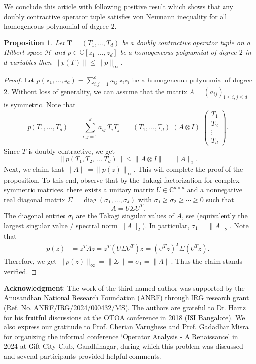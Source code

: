 \documentclass[12pt,reqno] {amsart}
\newtheorem{proposition}{Proposition}
\theoremstyle{remark}
\theoremstyle{definition}
\begin{document}
We conclude this article with following positive result which shows that  any doubly contractive operator tuple satisfies von Neumann inequality for all homogeneous polynomial of degree $2.$
\begin{proposition}\label{von Neumann's inequality for doubly contractive operators}
 Let \( \boldsymbol T = (T_1, \ldots, T_d) \) be a doubly contractive operator tuple on a Hilbert space $\mathcal{H}$ and $p\in \mathbb{C}[z_1,\ldots ,z_d]$  be a homogeneous polynomial of degree $2$ in $d$-variables then $\|p(T)\|\leq \|p\|_{\infty}$. 
 \end{proposition} 
 \begin{proof}
 Let $p(z_1,\ldots, z_d)=\sum_{i,j=1}^d a_{ij}\,z_i z_j$ be a homogeneous polynomial of degree $2.$ Without loss of generality, we can assume that the matrix $A=(a_{ij})_{1\le i,j\le d}$ is  symmetric. 
Note that
\[
p(T_1,\ldots,T_d)
 \;=\; \sum_{i,j=1}^d a_{ij}\,T_i T_j
 \;=\; (T_1,\ldots, T_d)\;
     (A \otimes I)\;
     \begin{pmatrix}
       T_1 \\[4pt] T_2 \\[4pt] \vdots \\[4pt] T_d
     \end{pmatrix}.
\]
Since $T$ is doubly contractive,  we get
$$\|p(T_1,T_2,\ldots,T_d)\| \leq \|A\otimes I\| = \|A\|_2.$$ 
Next, we claim that $\|A\|=\|p(z)\|_{\infty}$. This will complete the proof of the proposition. To this end, observe that 
by the Takagi factorization for complex symmetric matrices, there exists a unitary matrix \(U\in\mathbb{C}^{d\times d}\) and a nonnegative real diagonal matrix \(\Sigma=\operatorname{diag}(\sigma_1,\dots,\sigma_d)\) with \(\sigma_1\ge\sigma_2\ge\cdots\ge0\) such that
\[
A = U\Sigma U^T.
\]
The diagonal entries \(\sigma_i\) are the Takagi singular values of \(A\), see \cite{T.K} (equivalently the largest singular value / spectral norm \(\|A\|_2\)). In particular, \(\sigma_1=\|A\|_2\).
Note that 
\begin{align*}
p(z) &= z^T A z = z^T(U\Sigma U^T)z = (U^T z)^T \Sigma (U^T z).
\end{align*}
Therefore, we get $\|p(z)\|_{\infty}=\|\Sigma\|=\sigma_1=\|A\|.$ Thus the claim stands verified. 
  \end{proof}

\noindent\textbf{Acknowledgment:} The work of the third named author was supported by the Anusandhan National Research Foundation (ANRF) through IRG research grant (Ref. No. ANRF/IRG/2024/000432/MS). The authors are grateful to Dr. Hartz for his fruitful discussions at the OTOA conference in 2018 (ISI Bangalore). 
We also express our gratitude to Prof. Cherian Varughese and Prof. Gadadhar Misra for organizing the informal conference `Operator Analysis - A Renaissance' in 2024 at Gift City Club, Gandhinagar,  during which this problem was discussed and several participants provided helpful comments. 
\end{document}
